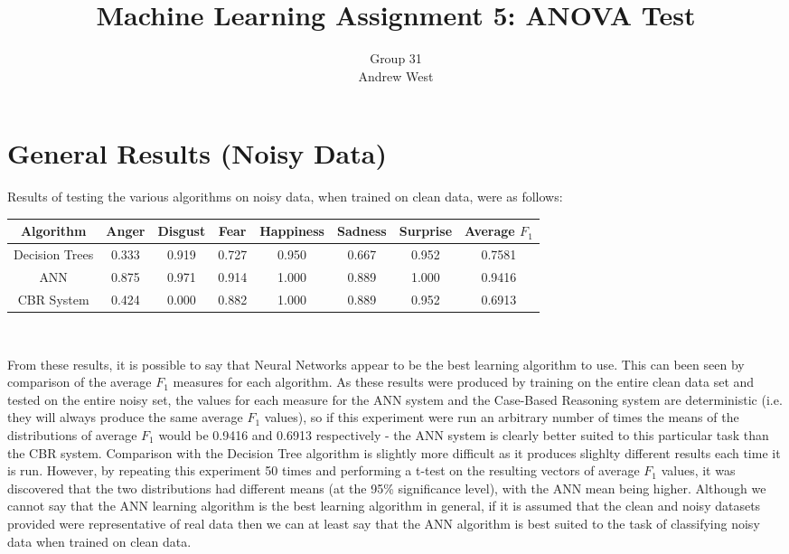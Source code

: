 \documentclass[a4paper]{article}
\title{Machine Learning Assignment 5: ANOVA Test}
\author{Group 31 \\ Andrew West}
\begin{document}
\maketitle

\section{General Results (Noisy Data)}

Results of testing the various algorithms on noisy data, when trained on clean data, were as follows:\\

\begin{center}
  \begin{tabular}{c|cccccc|c}
    Algorithm & Anger & Disgust & Fear & Happiness & Sadness & Surprise & Average $F_1$\\
    \hline
    Decision Trees 	& 0.333 & 0.919 & 0.727 & 0.950 & 0.667 & 0.952 & 0.7581 \\
	ANN 			& 0.875 & 0.971 & 0.914 & 1.000	& 0.889 & 1.000 & 0.9416 \\
	CBR System 		& 0.424 & 0.000 & 0.882 & 1.000	& 0.889 & 0.952 & 0.6913 \\
  \end{tabular}\\
  \end{center}
  
From these results, it is possible to say that Neural Networks appear to be the best learning algorithm to use. This can
been seen by comparison of the average $F_1$ measures for each algorithm. As these results were produced by training on
the entire clean data set and tested on the entire noisy set, the values for each measure for the ANN system and the
Case-Based Reasoning system are deterministic (i.e. they will always produce the same average $F_1$ values), so if this
experiment were run an arbitrary number of times the means of the distributions of average $F_1$ would be 0.9416 and
0.6913 respectively - the ANN system is clearly better suited to this particular task than the CBR system. Comparison
with the Decision Tree algorithm is slightly more difficult as it produces slighlty different results each time it is run.
However, by repeating this experiment 50 times and performing a t-test on the resulting vectors of average $F_1$ values,
it was discovered that the two distributions had different means (at the 95\% significance level), with the ANN mean being
higher. Although we cannot say that the ANN learning algorithm is the best learning algorithm in general, if it is assumed
that the clean and noisy datasets provided were representative of real data then we can at least say that the ANN algorithm
is best suited to the task of classifying noisy data when trained on clean data.\\
\end{document}
